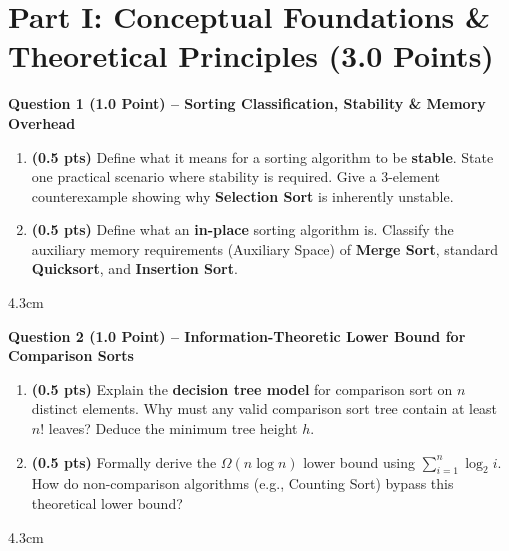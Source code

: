 \documentclass[11pt,a4paper]{article}
\begin{document}
\vspace{0.2em}

\section*{Part I: Conceptual Foundations \& Theoretical Principles (3.0 Points)}

\textbf{Question 1 (1.0 Point) -- Sorting Classification, Stability \& Memory Overhead}
\begin{enumerate}[label=(\alph*)]
    \item \textbf{(0.5 pts)} Define what it means for a sorting algorithm to be \textbf{stable}. State one practical scenario where stability is required. Give a 3-element counterexample showing why \textbf{Selection Sort} is inherently unstable.
    \item \textbf{(0.5 pts)} Define what an \textbf{in-place} sorting algorithm is. Classify the auxiliary memory requirements (Auxiliary Space) of \textbf{Merge Sort}, standard \textbf{Quicksort}, and \textbf{Insertion Sort}.
\end{enumerate}

\begin{answerbox}{4.3cm}
\end{answerbox}

\vspace{0.2em}

\textbf{Question 2 (1.0 Point) -- Information-Theoretic Lower Bound for Comparison Sorts}
\begin{enumerate}[label=(\alph*)]
    \item \textbf{(0.5 pts)} Explain the \textbf{decision tree model} for comparison sort on $n$ distinct elements. Why must any valid comparison sort tree contain at least $n!$ leaves? Deduce the minimum tree height $h$.
    \item \textbf{(0.5 pts)} Formally derive the $\Omega(n \log n)$ lower bound using $\sum_{i=1}^n \log_2 i$. How do non-comparison algorithms (e.g., Counting Sort) bypass this theoretical lower bound?
\end{enumerate}

\begin{answerbox}{4.3cm}
\end{answerbox}

\newpage

\end{document}
